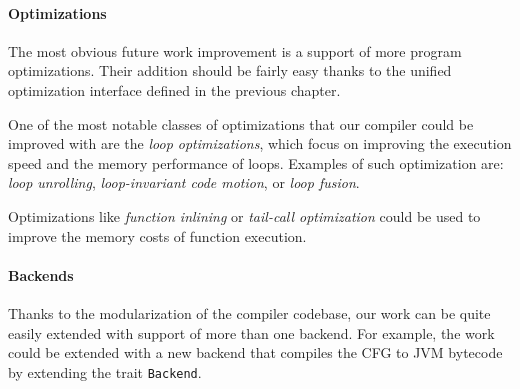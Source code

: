 \documentclass[thesis=M,english]{FITthesis}[2019/12/23]
\begin{document}
\paragraph*{Optimizations} The most obvious future work improvement is a support of more program optimizations. Their addition should be fairly easy thanks to the unified optimization interface defined in the previous chapter.

One of the most notable classes of optimizations that our compiler could be improved with are the \emph{loop optimizations}, which focus on improving the execution speed and the memory performance of loops. Examples of such optimization are: \emph{loop unrolling}, \emph{loop-invariant code motion}, or \emph{loop fusion}.

Optimizations like \emph{function inlining} or \emph{tail-call optimization} could be used to improve the memory costs of function execution.

\paragraph*{Backends} Thanks to the modularization of the compiler codebase, our work can be quite easily extended with support of more than one backend. For example, the work could be extended with a new backend that compiles the CFG to JVM bytecode by extending the trait \texttt{Backend}.





\appendix
\end{document}
